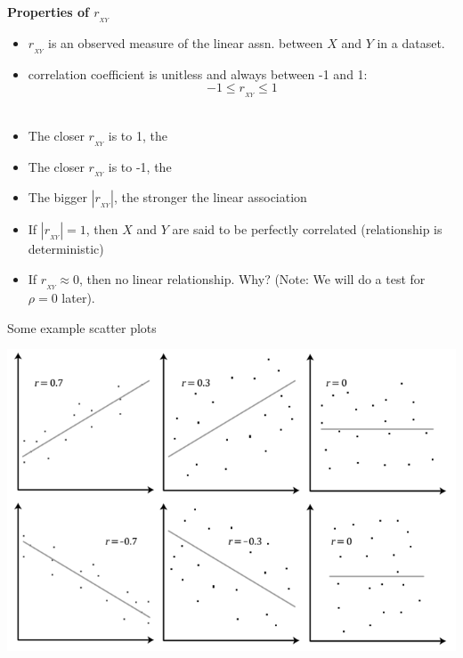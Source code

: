 \textbf{Properties of $r_{_{XY}}$}
\begin{itemize}
\item $r_{_{XY}}$ is an observed measure of the linear assn. between $X$ and $Y$ in a dataset.\\
\item correlation coefficient is unitless and always between -1 and 1:
$$ -1 \leq r_{_{XY}} \leq 1 $$~\\
\item The closer $r_{_{XY}}$ is to 1, the %
\underbar{~~~~~~~~~~~~~~~~~~~~~~~~~~~~~~~~~~~~~~~~~~~~~~~~~~~~~~~~~~~~~~~~~~~~~~~~~~~~~~~~~~~~~~~~}\\
\item The closer $r_{_{XY}}$ is to -1, the %
\underbar{~~~~~~~~~~~~~~~~~~~~~~~~~~~~~~~~~~~~~~~~~~~~~~~~~~~~~~~~~~~~~~~~~~~~~~~~~~~~~~~~~~~~~~~~}\\
\item The bigger $|r_{_{XY}}|$, the stronger the linear association \\
\item If $|r_{_{XY}}|=1$, then $X$ and $Y$ are said to be perfectly correlated (relationship is deterministic)\\
\item If $r_{_{XY}}\approx 0$, then no linear relationship.  Why?  (Note: We will do a test for $\rho=0$ later).
\end{itemize}
Some example scatter plots\\
\begin{center}
\includegraphics[scale=0.5]{scatterexamples}
\end{center}
\newpage


